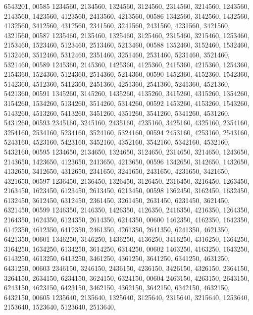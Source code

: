 \begin{DoxyCode}
      6543201,
00585       1234560, 2134560, 1324560, 3124560, 2314560, 3214560, 1243560, 2143560, 1423560, 4123560, 2413560, 
      4213560,
00586       1342560, 3142560, 1432560, 4132560, 3412560, 4312560, 2341560, 3241560, 2431560, 4231560, 3421560, 
      4321560,
00587       1235460, 2135460, 1325460, 3125460, 2315460, 3215460, 1253460, 2153460, 1523460, 5123460, 2513460, 
      5213460,
00588       1352460, 3152460, 1532460, 5132460, 3512460, 5312460, 2351460, 3251460, 2531460, 5231460, 3521460, 
      5321460,
00589       1245360, 2145360, 1425360, 4125360, 2415360, 4215360, 1254360, 2154360, 1524360, 5124360, 2514360, 
      5214360,
00590       1452360, 4152360, 1542360, 5142360, 4512360, 5412360, 2451360, 4251360, 2541360, 5241360, 4521360, 
      5421360,
00591       1345260, 3145260, 1435260, 4135260, 3415260, 4315260, 1354260, 3154260, 1534260, 5134260, 3514260, 
      5314260,
00592       1453260, 4153260, 1543260, 5143260, 4513260, 5413260, 3451260, 4351260, 3541260, 5341260, 4531260, 
      5431260,
00593       2345160, 3245160, 2435160, 4235160, 3425160, 4325160, 2354160, 3254160, 2534160, 5234160, 3524160, 
      5324160,
00594       2453160, 4253160, 2543160, 5243160, 4523160, 5423160, 3452160, 4352160, 3542160, 5342160, 4532160, 
      5432160,
00595       1234650, 2134650, 1324650, 3124650, 2314650, 3214650, 1243650, 2143650, 1423650, 4123650, 2413650, 
      4213650,
00596       1342650, 3142650, 1432650, 4132650, 3412650, 4312650, 2341650, 3241650, 2431650, 4231650, 3421650, 
      4321650,
00597       1236450, 2136450, 1326450, 3126450, 2316450, 3216450, 1263450, 2163450, 1623450, 6123450, 2613450, 
      6213450,
00598       1362450, 3162450, 1632450, 6132450, 3612450, 6312450, 2361450, 3261450, 2631450, 6231450, 3621450, 
      6321450,
00599       1246350, 2146350, 1426350, 4126350, 2416350, 4216350, 1264350, 2164350, 1624350, 6124350, 2614350, 
      6214350,
00600       1462350, 4162350, 1642350, 6142350, 4612350, 6412350, 2461350, 4261350, 2641350, 6241350, 4621350, 
      6421350,
00601       1346250, 3146250, 1436250, 4136250, 3416250, 4316250, 1364250, 3164250, 1634250, 6134250, 3614250, 
      6314250,
00602       1463250, 4163250, 1643250, 6143250, 4613250, 6413250, 3461250, 4361250, 3641250, 6341250, 4631250, 
      6431250,
00603       2346150, 3246150, 2436150, 4236150, 3426150, 4326150, 2364150, 3264150, 2634150, 6234150, 3624150, 
      6324150,
00604       2463150, 4263150, 2643150, 6243150, 4623150, 6423150, 3462150, 4362150, 3642150, 6342150, 4632150, 
      6432150,
00605       1235640, 2135640, 1325640, 3125640, 2315640, 3215640, 1253640, 2153640, 1523640, 5123640, 2513640, 

\end{DoxyCode}

